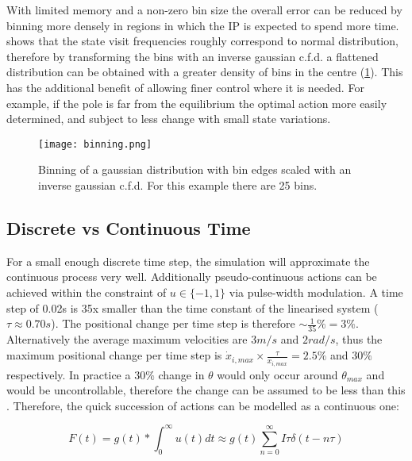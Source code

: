 \documentclass[../main.tex]{subfiles}
\begin{document}
With limited memory and a non-zero bin size the overall error can be reduced by binning more densely in regions in which the IP is expected to spend more time.  shows that the state visit frequencies roughly correspond to normal distribution, therefore by transforming the bins with an inverse gaussian c.f.d. a flattened distribution can be obtained with a greater density of bins in the centre (\cref{fig:binning}). This has the additional benefit of allowing finer control where it is needed. For example, if the pole is far from the equilibrium the optimal action more easily determined, and subject to less change with small state variations.

\begin{figure}[h]
   \centering
   \texttt{[image: binning.png]}
   \caption{Binning of a gaussian distribution with bin edges scaled with an inverse gaussian c.f.d. For this example there are 25 bins.}
   \label{fig:binning}
\end{figure}

\subsection{Discrete vs Continuous Time}

For a small enough discrete time step, the simulation will approximate the continuous process very well. Additionally pseudo-continuous actions can be achieved within the constraint of $u \in \{-1, 1\}$ via pulse-width modulation. A time step of 0.02s is 35x smaller than the time constant of the linearised system ($\tau \approx 0.70s$). The positional change per time step is therefore $\sim \frac{1}{35}\% = 3\%$. Alternatively the average maximum velocities are $3m/s$ and $2rad/s$, thus the maximum positional change per time step is $\dot{x}_{i, max} \times \frac{\tau}{x_{i, max}} = 2.5\%$ and $30\%$ respectively. In practice a $30\%$ change in $\theta$ would only occur around $\theta_{max}$ and would be uncontrollable, therefore the change can be assumed to be less than this . Therefore, the quick succession of actions can be modelled as a continuous one:

\begin{equation}
   F(t) = g(t) * \int^\infty_0 u(t) dt \approx g(t) \sum^\infty_{n=0} I\tau \delta(t-n\tau)
\end{equation} 
\end{document}
